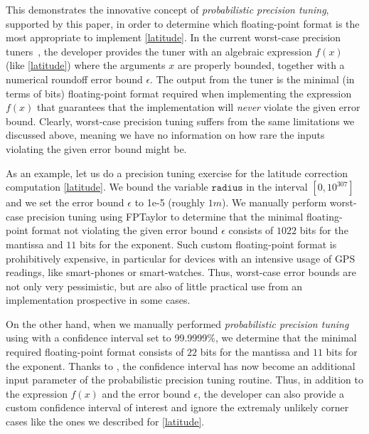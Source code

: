 %
This demonstrates the innovative concept of \emph{probabilistic precision tuning}, supported by this paper, in order to determine which floating-point format is the most appropriate to implement \eqref{latitude}.
%
In the current worst-case precision tuners~\cite{fptuner,darulova2018daisy}, the developer provides the tuner with an algebraic expression $f(x)$ (like \eqref{latitude}) where the arguments $x$ are properly bounded, together with a numerical roundoff error bound $\epsilon$.
%
The output from the tuner is the minimal (in terms of bits) floating-point format required when implementing the expression $f(x)$ that guarantees that the implementation will \emph{never} violate the given error bound.
%
Clearly, worst-case precision tuning suffers from the same limitations we discussed above, meaning we have no information on how rare the inputs violating the given error bound might be. 

%
As an example, let us do a precision tuning exercise for the latitude correction computation \eqref{latitude}. We bound the variable $\mathtt{radius}$ in the interval $[0, 10^{307}]$ and we set the error bound $\epsilon$ to 1e-5 (roughly $1m$).
%
We manually perform worst-case precision tuning using FPTaylor to determine that the minimal floating-point format not violating the given error bound $\epsilon$ consists of $1022$ bits for the mantissa and $11$ bits for the exponent.
%
Such custom floating-point format is prohibitively expensive, in particular for devices with an intensive usage of GPS readings, like smart-phones or smart-watches. 
%
Thus, worst-case error bounds are not only very pessimistic, but are also of little practical use from an implementation prospective in some cases.

%
On the other hand, when we manually performed \emph{probabilistic precision tuning} using \Tool with a confidence interval set to 99.9999\%, we determine that the minimal required floating-point format consists of $22$ bits for the mantissa and $11$ bits for the exponent.
%
Thanks to \Tool, the confidence interval has now become an additional input parameter of the probabilistic precision tuning routine. Thus, in addition to the expression $f(x)$ and the error bound $\epsilon$, the developer can also provide a custom confidence interval of interest and ignore the extremaly unlikely corner cases like the ones we described for \eqref{latitude}.
